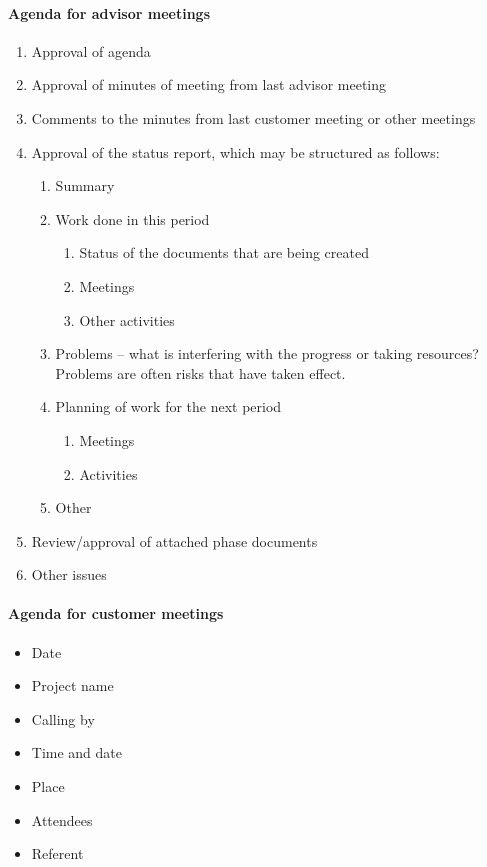 \paragraph{Agenda for advisor meetings}\hfill
\newline
\begin{enumerate}
\item{}Approval of agenda 
\item{}Approval of minutes of meeting from last advisor meeting
\item{}Comments to the minutes from last customer meeting or other meetings
\item{}Approval of the status report, which may be structured as follows:
\begin{enumerate}
\item{} Summary
\item{} Work done in this period
\begin{enumerate}
\item{}Status of the documents that are being created
\item{}Meetings
\item{}Other activities
\end{enumerate}
\item{}Problems – what is interfering with the progress or taking resources? Problems are often risks that have taken effect.
\item{}Planning of work for the next period
\begin{enumerate}
\item{}Meetings
\item{}Activities
\end{enumerate}
\item{}Other
\end{enumerate}
\item{}Review/approval of attached phase documents
\item{}Other issues
\end{enumerate}

\paragraph{Agenda for customer meetings} \hfill
\newline
\begin{itemize}
\item{}Date
\item{}Project name
\item{}Calling by
\item{}Time and date 
\item{}Place 
\item{}Attendees 
\item{}Referent
\end{itemize}


